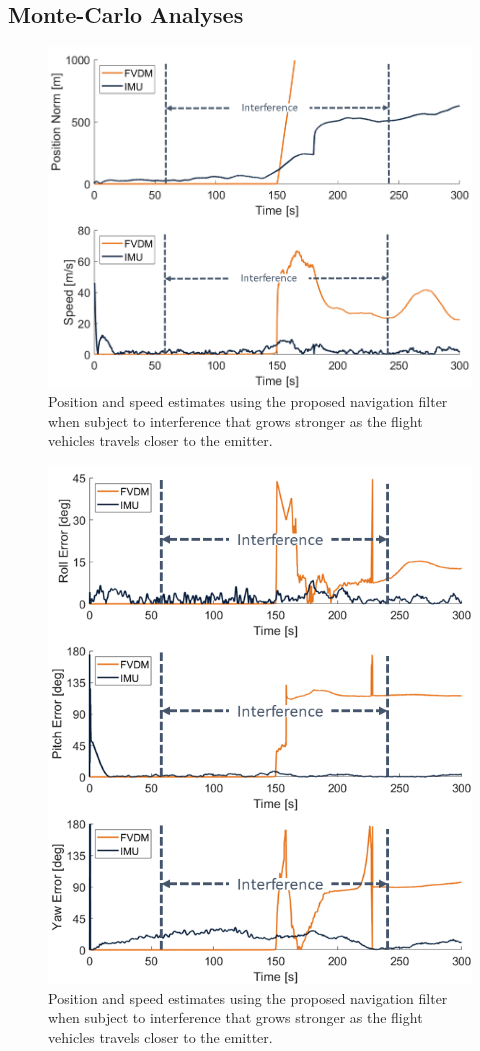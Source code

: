 \subsection{\textbf{Monte-Carlo Analyses}}

\begin{figure}[!ht]
    \centering
    \includegraphics[width=0.75\linewidth]{Figures/Results/trajectoryfigure/Slide19.PNG}
    \caption{Position and speed estimates using the proposed navigation filter when subject to interference that grows stronger as the flight vehicles travels closer to the emitter.}\label{fig:PosVelScene2}
\end{figure}


\begin{figure}[!ht]
    \centering
    \includegraphics[width=0.75\linewidth]{Figures/Results/trajectoryfigure/Slide7.PNG}
    \caption{Position and speed estimates using the proposed navigation filter when subject to interference that grows stronger as the flight vehicles travels closer to the emitter.}\label{fig:EulScene2}
\end{figure}


